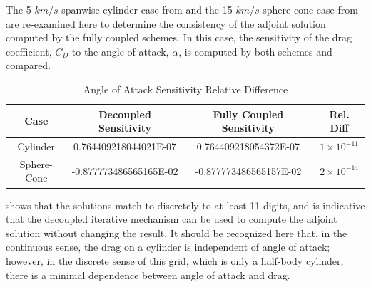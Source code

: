 The 5 $km/s$ spanwise cylinder case from  and the 15
$km/s$ sphere cone case from  are re-examined here
to determine the consistency of the adjoint solution computed by the fully
coupled schemes.  In this case, the sensitivity of the drag coefficient, $C_D$
to the angle of attack, $\alpha$, is computed by both schemes and compared.
\begin{table}[h]
  \centering
  \begin{tabular}{c|c|c|c}
    Case & Decoupled Sensitivity & Fully Coupled Sensitivity & Rel. Diff\\
    \hline
    Cylinder    &  0.764409218044021E-07 &  0.764409218054372E-07 & $1 \times 10^{-11}$ \\
    Sphere-Cone & -0.877773486565165E-02 & -0.877773486565157E-02 & $2 \times 10^{-14}$
  \end{tabular}
  \caption{Angle of Attack Sensitivity Relative Difference}
  \label{tab:cylinder-adj-diff}
\end{table}
 shows that the solutions match to discretely to at
least 11 digits, and is indicative that the decoupled iterative mechanism can be
used to compute the adjoint solution without changing the result.  It should be
recognized here that, in the continuous sense, the drag on a cylinder is
independent of angle of attack; however, in the discrete sense of this grid,
which is only a half-body cylinder, there is a minimal dependence between angle
of attack and drag.


